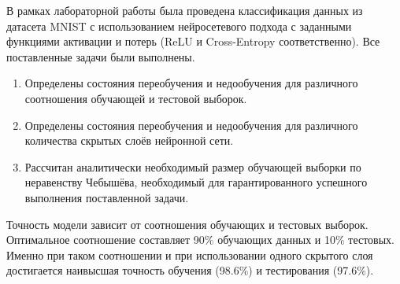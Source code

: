 
В рамках лабораторной работы была проведена классификация данных из датасета MNIST с использованием нейросетевого подхода с заданными функциями активации и потерь (ReLU и Cross-Entropy соответственно). Все поставленные задачи были выполнены.

\begin{enumerate}[label*=\arabic*)]
	\item Определены состояния переобучения и недообучения для различного соотношения обучающей и тестовой выборок.
	\item Определены состояния переобучения и недообучения для различного количества скрытых слоёв нейронной сети.
	\item Рассчитан аналитически необходимый размер обучающей выборки по неравенству Чебышёва, необходимый для гарантированного успешного выполнения поставленной задачи.
\end{enumerate}

Точность модели зависит от соотношения обучающих и тестовых выборок. Оптимальное соотношение составляет 90\% обучающих данных и 10\% тестовых. Именно при таком соотношении и при использовании одного скрытого слоя достигается наивысшая точность обучения (98.6\%) и тестирования (97.6\%).
